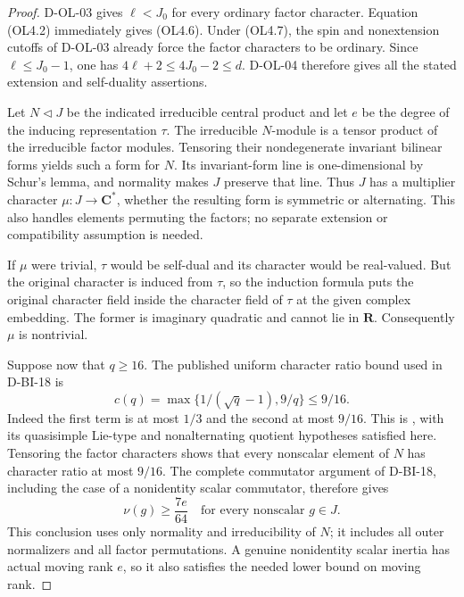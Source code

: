 \begin{proof}
D-OL-03 gives $\ell<J_0$ for every ordinary factor character.
Equation (OL4.2) immediately gives (OL4.6).  Under (OL4.7), the
spin and nonextension cutoffs of D-OL-03 already force the factor
characters to be ordinary.  Since $\ell\le J_0-1$, one has
$4\ell+2\le4J_0-2\le d$.  D-OL-04 therefore gives all the stated
extension and self-duality assertions.

Let $N\triangleleft J$ be the indicated irreducible central
product and let $e$ be the degree of the inducing representation
$\tau$.  The irreducible $N$-module is a tensor product of the
irreducible factor modules.  Tensoring their nondegenerate invariant
bilinear forms yields such a form for $N$.  Its invariant-form line
is one-dimensional by Schur's lemma, and normality makes $J$
preserve that line.  Thus $J$ has a multiplier character
$\mu:J\to\mathbf C^*$, whether the resulting form is symmetric or
alternating.  This also handles elements permuting the factors;
no separate extension or compatibility assumption is needed.

If $\mu$ were trivial, $\tau$ would be self-dual and its character
would be real-valued.  But the original character is induced from
$\tau$, so the induction formula puts the original character field
inside the character field of $\tau$ at the given complex embedding.
The former is imaginary quadratic and cannot lie in $\mathbf R$.
Consequently $\mu$ is nontrivial.

Suppose now that $q\ge16$.  The published uniform character ratio
bound used in D-BI-18 is
\[
 c(q)=\max\{1/(\sqrt q-1),9/q\}\le9/16.                       \tag{OL4.9}
\]
Indeed the first term is at most $1/3$ and the second at most
$9/16$.  This is \cite[Theorem~4.1(2), p.~141]{BI:DHP}, with its
quasisimple Lie-type and nonalternating quotient hypotheses
satisfied here.  Tensoring the factor characters shows that every
nonscalar element of $N$ has character ratio at most $9/16$.
The complete commutator argument of D-BI-18, including the case
of a nonidentity scalar commutator, therefore gives
\[
             \nu(g)\ge\frac{7e}{64}\quad
                     \text{for every nonscalar }g\in J.      \tag{OL4.10}
\]
This conclusion uses only normality and irreducibility of $N$;
it includes all outer normalizers and all factor permutations.
A genuine nonidentity scalar inertia has actual moving rank $e$,
so it also satisfies the needed lower bound on moving rank.


\end{proof}
